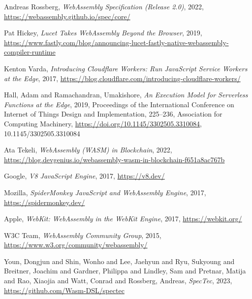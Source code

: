 \begin{thebibliography}{00}

 Andreas Rossberg, \textit{WebAssembly Specification (Release 2.0)}, 2022, \url{https://webassembly.github.io/spec/core/}

 Pat Hickey, \textit{Lucet Takes WebAssembly Beyond the Browser}, 2019, \url{https://www.fastly.com/blog/announcing-lucet-fastly-native-webassembly-compiler-runtime}

 Kenton Varda, \textit{Introducing Cloudflare Workers: Run JavaScript Service Workers at the Edge}, 2017, \url{https://blog.cloudflare.com/introducing-cloudflare-workers/}

 Hall, Adam and Ramachandran, Umakishore, \textit{An Execution Model for Serverless Functions at the Edge}, 2019,
 Proceedings of the International Conference on Internet of Things Design and Implementation, 225–236, Association for Computing Machinery, \url{https://doi.org/10.1145/3302505.3310084}, 10.1145/3302505.3310084

 Ata Tekeli, \textit{WebAssembly (WASM) in Blockchain}, 2022, \url{https://blog.devgenius.io/webassembly-wasm-in-blockchain-f651a8ac767b}

 Google, \textit{V8 JavaScript Engine}, 2017, \url{https://v8.dev/}

 Mozilla, \textit{SpiderMonkey JavaScript and WebAssembly Engine}, 2017, \url{https://spidermonkey.dev/}

 Apple, \textit{WebKit: WebAssembly in the WebKit Engine}, 2017, \url{https://webkit.org/}

 W3C Team, \textit{WebAssembly Community Group}, 2015, \url{https://www.w3.org/community/webassembly/}

 Youn, Dongjun and Shin, Wonho and Lee, Jaehyun  and Ryu, Sukyoung and Breitner, Joachim and Gardner, Philippa and Lindley, Sam and Pretnar, Matija and Rao, Xiaojia and Watt, Conrad and Rossberg, Andreas, \textit{SpecTec}, 2023, \url{https://github.com/Wasm-DSL/spectec}



\end{thebibliography}
